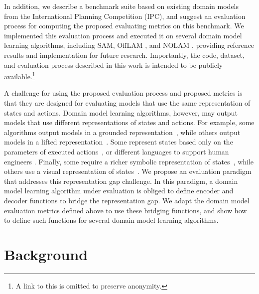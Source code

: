 \documentclass{article}
\theoremstyle{definition}
\theoremstyle{remark}
\newcommand{\sam}{\ac{SAM}\xspace}
\newif\ifaddcomments
\newcommand{\roni}[1]{\ifaddcomments{\textcolor{red}{[Roni: #1]}}\fi}
\begin{document}
In addition, we describe a benchmark suite  based on existing domain models from the International Planning Competition (IPC), 
and suggest an evaluation process for 
computing the proposed evaluating metrics on this benchmark.  
We implemented this evaluation process and executed it on several domain model learning algorithms, including \sam \citep{juba2021safe}, OffLAM \citep{LAMANNA2025104256}, and NOLAM \citep{Lamanna24}, providing reference results and implementation for future research. Importantly, the code, dataset, and evaluation process described in this work is intended to be publicly available.\footnote{A link to this is omitted to preserve anonymity.} 


A challenge for using the proposed evaluation process and proposed metrics is that they are designed for evaluating models that use the same representation of states and actions. 
Domain model learning algorithms, however, may output models that use different representations of states and actions. 
For example, some algorithms output models in a grounded representation~\citep{stern2017efficient}, while others output models in a lifted representation~\citep{juba2021safe,xi2024neuro,LAMANNA2025104256}. 
Some represent states based only on the parameters of executed actions~\citep{cresswell2011generalised}, or different languages to support human engineers \citep{mccluskey2010action}. 
Finally, some require a richer symbolic representation of states~\citep{juba2021safe, Lamanna24}, while others use a visual representation of states~\citep{asai2022classical, xi2024neuro}.
We propose an evaluation paradigm that addresses this representation gap challenge. 
In this paradigm, a domain model learning algorithm under evaluation is obliged to define encoder and decoder functions to bridge the representation gap. 
We adapt the domain model evaluation metrics defined above to use these bridging functions, 
and show how to define such functions for several domain model learning algorithms. 





\section{Background}
\end{document}
